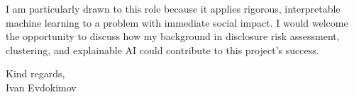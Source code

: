 \documentclass[11pt]{letter}
\begin{document}
I am particularly drawn to this role because it applies rigorous, interpretable machine learning to a problem with immediate social impact. I would welcome the opportunity to discuss how my background in disclosure risk assessment, clustering, and explainable AI could contribute to this project's success.

Kind regards,\\
Ivan Evdokimov
\end{document}
